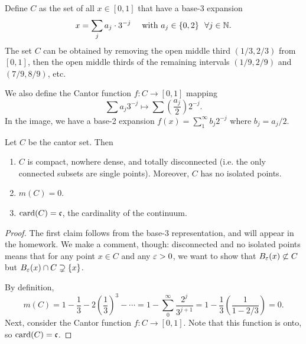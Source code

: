 \documentclass[12pt]{article} %
\begin{document}
\begin{definition}
    Define $C$ as the set of all $x \in [0,1]$ that have a base-3 expansion \[x = \sum_j a_j \cdot 3^{-j} \ \ \ \ \text{with} \ a_j \in \{0,2\} \ \ \forall j \in \mathbb{N}.\]
    The set $C$ can be obtained by removing the open middle third $(1/3, 2/3)$ from $[0,1]$, then the open middle thirds of the remaining intervals $(1/9, 2/9)$ and $(7/9, 8/9)$, etc.

    We also define the Cantor function $f : C \to [0,1]$ mapping \[\sum a_j 3^{-j} \mapsto \sum \left(\frac{a_j}{2}\right) 2^{-j}.\] In the image, we have a base-2 expansion $f(x) = \sum_1^\infty b_j 2^{-j}$ where $b_j = a_j / 2$.
\end{definition}

\begin{proposition}
    Let $C$ be the cantor set. Then \begin{enumerate}
        \item $C$ is compact, nowhere dense, and totally disconnected (i.e. the only connected subsets are single points). Moreover, $C$ has no isolated points.
        \item $m(C) = 0$.
        \item $\operatorname{card}(C) = \mathfrak{c}$, the cardinality of the continuum.
    \end{enumerate}
\end{proposition}

\begin{proof}
    The first claim follows from the base-3 representation, and will appear in the homework. We make a comment, though: disconnected and no isolated points means that for any point $x \in C$ and any $\varepsilon > 0$, we want to show that $B_\varepsilon(x) \not\subset C$ but $B_\varepsilon(x) \cap C \supsetneq \{x\}$.

    By definition, \[m(C) = 1 - \frac{1}{3} - 2\left(\frac{1}{3}\right)^3 - \cdots = 1 - \sum_0^\infty \frac{2^j}{3^{j+1}} = 1 - \frac{1}{3} \left(\frac{1}{1 - 2/3}\right) = 0.\] Next, consider the Cantor function $f : C \to [0,1]$. Note that this function is onto, so $\operatorname{card}(C) = \mathfrak{c}$.
\end{proof}
\end{document}
